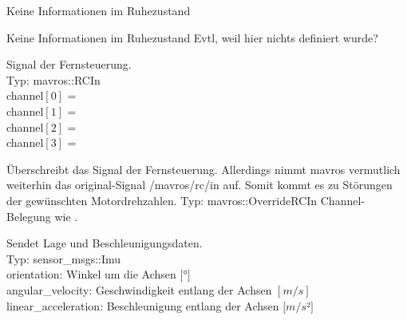 

















Keine Informationen im Ruhezustand

Keine Informationen im Ruhezustand
Evtl, weil hier nichts definiert wurde?
















Signal der Fernsteuerung. \\
Typ: mavros::RCIn \\
channel$[0]$ = \\
channel$[1]$ = \\
channel$[2]$ = \\
channel$[3]$ = 


Überschreibt das Signal der Fernsteuerung. Allerdings nimmt mavros vermutlich weiterhin das original-Signal /mavros/rc/in auf. Somit kommt es zu Störungen der gewünschten Motordrehzahlen. 
Typ: mavros::OverrideRCIn
Channel-Belegung wie .













Sendet Lage und Beschleunigungsdaten.\\
Typ: sensor\_msgs::Imu \\
orientation: Winkel um die Achsen $[$°$]$\\
angular\_velocity: Geschwindigkeit entlang der Achsen $[m/s]$\\
linear\_acceleration: Beschleunigung entlang der Achsen $[m/s$²$]$


